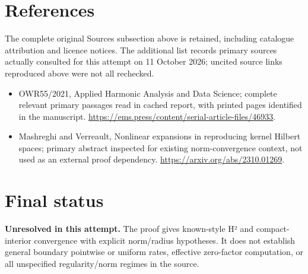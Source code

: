 \documentclass[11pt]{article}
\begin{document}
\section{References}
The complete original Sources subsection above is retained, including catalogue attribution and licence notices. The additional list records primary sources actually consulted for this attempt on 11 October 2026; uncited source links reproduced above were not all rechecked.
\begin{itemize}
\item OWR55/2021, Applied Harmonic Analysis and Data Science; complete relevant primary passages read in cached report, with printed pages identified in the manuscript. \url{https://ems.press/content/serial-article-files/46933}.
\item Mashreghi and Verreault, Nonlinear expansions in reproducing kernel Hilbert spaces; primary abstract inspected for existing norm-convergence context, not used as an external proof dependency. \url{https://arxiv.org/abs/2310.01269}.
\end{itemize}
\section{Final status}
\textbf{Unresolved in this attempt.} The proof gives known-style H² and compact-interior convergence with explicit norm/radius hypotheses. It does not establish general boundary pointwise or uniform rates, effective zero-factor computation, or all unspecified regularity/norm regimes in the source.
\end{document}
